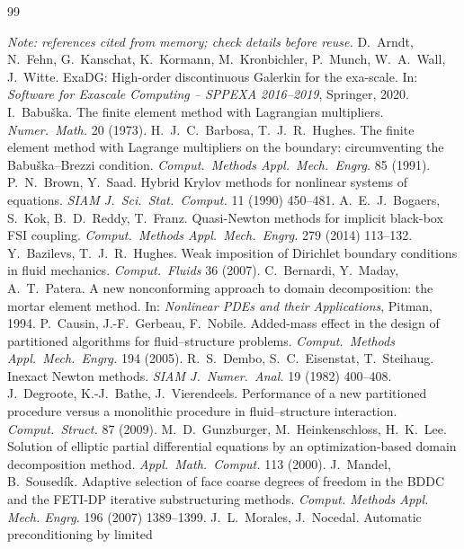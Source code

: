 \documentclass[11pt,a4paper]{article}
\theoremstyle{definition}
\theoremstyle{remark}
\begin{document}
\begin{thebibliography}{99}\small
\item[] \emph{Note: references cited from memory; check details before reuse.}
 D.~Arndt, N.~Fehn, G.~Kanschat, K.~Kormann, M.~Kronbichler, P.~Munch, W.~A.~Wall,
J.~Witte. ExaDG: High-order discontinuous Galerkin for the exa-scale. In: \emph{Software for
Exascale Computing -- SPPEXA 2016--2019}, Springer, 2020.
 I.~Babu\v{s}ka. The finite element method with Lagrangian multipliers.
\emph{Numer.\ Math.} 20 (1973).
 H.~J.~C.~Barbosa, T.~J.~R.~Hughes. The finite element method with
Lagrange multipliers on the boundary: circumventing the Babu\v{s}ka--Brezzi condition.
\emph{Comput.\ Methods Appl.\ Mech.\ Engrg.} 85 (1991).
 P.~N.~Brown, Y.~Saad. Hybrid Krylov methods for nonlinear systems of
equations. \emph{SIAM J.\ Sci.\ Stat.\ Comput.} 11 (1990) 450--481.
 A.~E.~J.~Bogaers, S.~Kok, B.~D.~Reddy, T.~Franz. Quasi-Newton methods for
implicit black-box FSI coupling. \emph{Comput.\ Methods Appl.\ Mech.\ Engrg.} 279 (2014) 113--132.
 Y.~Bazilevs, T.~J.~R.~Hughes. Weak imposition of Dirichlet boundary
conditions in fluid mechanics. \emph{Comput.\ Fluids} 36 (2007).
 C.~Bernardi, Y.~Maday, A.~T.~Patera. A new nonconforming approach
to domain decomposition: the mortar element method. In: \emph{Nonlinear PDEs and their
Applications}, Pitman, 1994.
 P.~Causin, J.-F.~Gerbeau, F.~Nobile. Added-mass effect in the
design of partitioned algorithms for fluid--structure problems. \emph{Comput.\ Methods Appl.\
Mech.\ Engrg.} 194 (2005).
 R.~S.~Dembo, S.~C.~Eisenstat, T.~Steihaug. Inexact Newton
methods. \emph{SIAM J.\ Numer.\ Anal.} 19 (1982) 400--408.
 J.~Degroote, K.-J.~Bathe, J.~Vierendeels. Performance of a new partitioned
procedure versus a monolithic procedure in fluid--structure interaction. \emph{Comput.\ Struct.}
87 (2009).
 M.~D.~Gunzburger, M.~Heinkenschloss, H.~K.~Lee. Solution
of elliptic partial differential equations by an optimization-based domain decomposition method.
\emph{Appl.\ Math.\ Comput.} 113 (2000).
 J.~Mandel, B.~Soused\'ik. Adaptive selection of face coarse degrees
of freedom in the BDDC and the FETI-DP iterative substructuring methods. \emph{Comput. Methods
Appl. Mech. Engrg.} 196 (2007) 1389--1399.
 J.~L.~Morales, J.~Nocedal. Automatic preconditioning by limited

\end{thebibliography}
\end{document}
